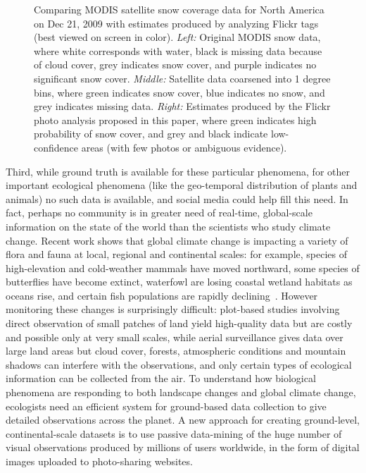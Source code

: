 \begin{figure}[th]
\caption{Comparing MODIS satellite snow coverage data for North
  America on Dec 21, 2009 with estimates produced by analyzing Flickr
  tags (best viewed on screen in color). \textit{Left:} Original MODIS snow data, where white
  corresponds with water, black is missing data because of cloud
  cover, grey indicates snow cover, and purple indicates no
  significant snow cover.  \textit{Middle:} Satellite data coarsened
  into 1 degree bins, where green indicates snow cover, blue indicates
  no snow, and grey indicates missing data.  \textit{Right:} Estimates
  produced by the Flickr photo analysis proposed in this paper, where
  green indicates high probability of snow cover, and grey and black
  indicate low-confidence areas (with few photos or ambiguous evidence).}
\label{fig:samplemap}
\end{figure}


Third, while ground truth is available for these particular
phenomena, for other important ecological phenomena (like the geo-temporal distribution of plants and animals) no such data is
available, and social media could help fill this need.
In fact, perhaps no community is in greater need of
real-time, global-scale information on the state of the world than the
scientists who study climate change. Recent work shows that global
climate change is impacting a variety of flora and fauna at local,
regional and continental scales: for example, species of
high-elevation and cold-weather mammals have moved northward, some
species of butterflies have become extinct, waterfowl are losing
coastal wetland habitats as oceans rise, and certain fish populations
are rapidly declining~\cite{ipcc2007climate}. However monitoring these
changes is surprisingly difficult: plot-based studies
involving direct observation of small patches of land yield
high-quality data but are costly and possible only at very small
scales, while aerial surveillance gives data over
large land areas but cloud cover, forests, atmospheric
conditions and mountain shadows can interfere with the observations,
and only certain types of ecological information can be collected from
the air.  To understand how biological phenomena are responding to
both landscape changes and global climate change, ecologists need an
efficient system for ground-based data collection to give detailed
observations across the planet.  A new approach
for creating ground-level, continental-scale datasets is to use
passive data-mining of the huge number of visual observations produced
by millions of users worldwide, in the form of digital images uploaded
to photo-sharing websites.


